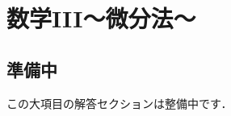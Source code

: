 \documentclass[../../ms_a.tex]{subfiles}
\begin{document}
\section{数学III～微分法～}

\subsection*{準備中}
この大項目の解答セクションは整備中です．
\end{document}
